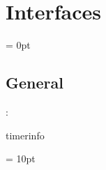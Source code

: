 
\section{Interfaces} 


\parskip = 0pt

\vspace{3mm} \subsection*{General}

: 

timerinfo
\vspace{2mm}

\vspace{5mm}\parskip = 10pt 
